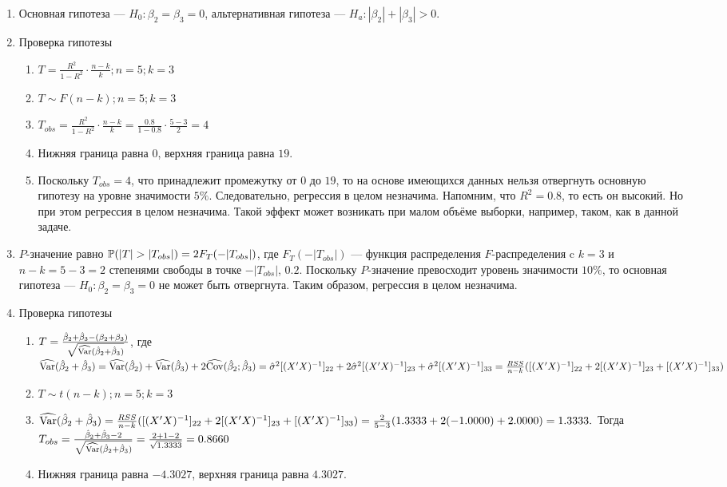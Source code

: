 \begin{problem}
\begin{sol}
\begin{enumerate}
\item Основная гипотеза — $H_0: \beta_2 = \beta_3 = 0$, альтернативная гипотеза — $H_a: |\beta_2| + |\beta_3| > 0$.
\item Проверка гипотезы
\begin{enumerate}
\item $T = \frac{R^2}{1 - R^2} \cdot \frac{n-k}{k}; n = 5; k = 3$
\item $T \sim F(n-k); n = 5; k = 3$
\item $T_{obs} = \frac{R^2}{1 - R^2} \cdot \frac{n-k}{k} = \frac{0.8}{1 - 0.8} \cdot \frac{5-3}{2} = 4$
\item Нижняя граница равна $0$, верхняя граница равна $19$.
\item Поскольку $T_{obs} = 4$, что принадлежит промежутку от $0$ до $19$, 
то на основе имеющихся данных нельзя отвергнуть основную гипотезу на уровне значимости $5\%$. 
Следовательно, регрессия в целом незначима. 
Напомним, что $R^2 = 0.8$, то есть он высокий. Но при этом регрессия в целом незначима. 
Такой эффект может возникать при малом объёме выборки, например, таком, как в данной задаче.
\end{enumerate}
\item $P$-значение равно $\P (|T|>|T_{obs}|) = 2F_{T}(-|T_{obs}|)$, 
где $F_{T}(-|T_{obs}|)$ — функция распределения $F$-распределения c $k = 3$ и $n - k = 5 - 3 = 2$ степенями свободы в точке $-|T_{obs}|$, $0.2$. 
Поскольку $P$-значение превосходит уровень значимости $10\%$, то основная гипотеза — $H_0: \beta_2 = \beta_3 = 0$ 
не может быть отвергнута. Таким образом, регрессия в целом незначима.
\item Проверка гипотезы
\begin{enumerate}
\item $T = \frac{\hat{\beta}_2 + \hat{\beta}_3 - (\beta_2 + \beta_3)}{\sqrt{\widehat{\operatorname{Var}}(\hat{\beta}_2 + \hat{\beta}_3)}}$, где $\widehat{\operatorname{Var}}(\hat{\beta}_2 + \hat{\beta}_3) = \widehat{\operatorname{Var}}(\hat{\beta}_2) + \widehat{\operatorname{Var}}(\hat{\beta}_3) + 2\widehat{\operatorname{Cov}}(\hat{\beta}_2;\hat{\beta}_3) = \hat{\sigma}^2 [(X'X)^{-1}]_{22} + 2\hat{\sigma}^2 [(X'X)^{-1}]_{23} + \hat{\sigma}^2 [(X'X)^{-1}]_{33}= \frac{RSS}{n - k}([(X'X)^{-1}]_{22} + 2[(X'X)^{-1}]_{23} + [(X'X)^{-1}]_{33})$
\item $T \sim t(n-k); n = 5; k = 3$
\item $\widehat{\operatorname{Var}}(\hat{\beta}_2 + \hat{\beta}_3) = \frac{RSS}{n - k}([(X'X)^{-1}]_{22} + 2[(X'X)^{-1}]_{23} + [(X'X)^{-1}]_{33}) = \frac{2}{5 - 3} (1.3333 + 2(-1.0000) + 2.0000) = 1.3333.$ Тогда $T_{obs} = \frac{\hat{\beta}_2 + \hat{\beta}_3 - 2}{\sqrt{\widehat{\operatorname{Var}}(\hat{\beta}_2 + \hat{\beta}_3)}} = \frac{2 + 1 - 2}{\sqrt{1.3333}} = 0.8660$
\item Нижняя граница равна $- 4.3027$, верхняя граница равна $4.3027$.

\end{enumerate}
\end{enumerate}
\end{sol}
\end{problem}
